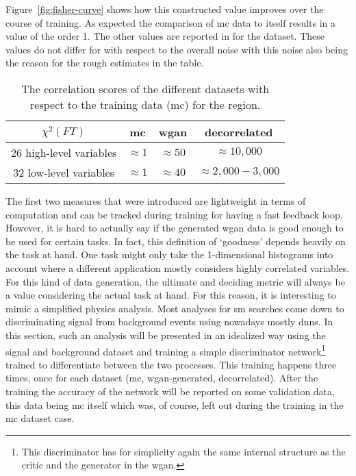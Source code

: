 Figure~\ref{fig:fisher-curve} shows how this constructed value improves over the course of training. As expected the comparison of \gls{mc} data to itself results in a value of the order 1. The other values are reported in  for the \signal{} dataset. These values do not differ for \background{} with respect to the overall noise with this noise also being the reason for the rough estimates in the table.
\begin{table}
    \centering
    \begin{tabular}{cccc}
        \(\chi^2(FT)\) & \gls{mc} & \gls{wgan} & decorrelated \\
        \midrule
        26 high-level variables & \(\approx 1\) & \(\approx 50\) & \(\approx 10,000\) \\
        32 low-level variables & \(\approx 1\) & \(\approx 40\) & \(\approx 2,000-3,000\)
    \end{tabular}
    \caption{The correlation scores of the different datasets with respect to the training data (\gls{mc}) for the \signal{} region.}\label{tab:fisher}
\end{table}


The first two measures that were introduced are lightweight in terms of computation and can be tracked during training for having a fast feedback loop. However, it is hard to actually say if the generated \gls{wgan} data is good enough to be used for certain tasks. In fact, this definition of `goodness' depends heavily on the task at hand. One task might only take the 1-dimensional histograms into account where a different application mostly considers highly correlated variables. For this kind of data generation, the ultimate and deciding metric will always be a value considering the actual task at hand. For this reason, it is interesting to mimic a simplified physics analysis. Most analyses for \gls{sm} searches come down to discriminating signal from background events using nowadays mostly \glspl{dnn}. In this section, such an analysis will be presented in an idealized way using the signal and background dataset and training a simple discriminator network\footnote{This discriminator has for simplicity again the same internal structure as the critic and the generator in the \gls{wgan}.} trained to differentiate between the two processes. This training happens three times, once for each dataset (\gls{mc}, \gls{wgan}-generated, decorrelated). After the training the accuracy of the network will be reported on some validation data, this data being \gls{mc} itself which was, of course, left out during the training in the \gls{mc} dataset case.

